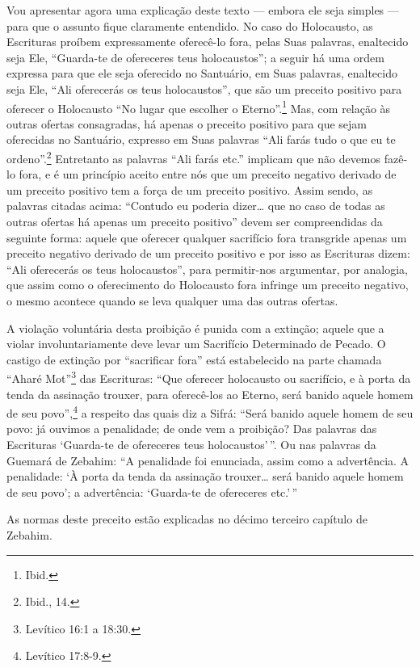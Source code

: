 Vou apresentar agora uma explicação deste texto --- embora ele seja
simples --- para que o assunto fique claramente entendido. No caso do
Holocausto, as Escrituras proíbem expressamente oferecê-lo fora, pelas
Suas palavras, enaltecido seja Ele, ``Guarda-te de ofereceres teus
holocaustos''; a seguir há uma ordem expressa para que ele seja
oferecido no Santuário, em Suas palavras, enaltecido seja Ele, ``Ali
oferecerás os teus holocaustos'', que são um preceito positivo para
oferecer o Holocausto ``No lugar que escolher o Eterno''.\footnote{Ibid.} Mas,
com relação às outras ofertas consagradas, há apenas o preceito
positivo para que sejam oferecidas no Santuário, expresso em Suas
palavras ``Ali farás tudo o que eu te ordeno''.\footnote{Ibid., 14.} Entretanto as
palavras ``Ali farás etc.'' implicam que não devemos fazê-lo fora, e é
um princípio aceito entre nós que um preceito negativo derivado de um
preceito positivo tem a força de um preceito positivo. Assim sendo, as
palavras citadas acima: ``Contudo eu poderia dizer\ldots{} que no caso de
todas as outras ofertas há apenas um preceito positivo'' devem ser
compreendidas da seguinte forma: aquele que oferecer qualquer
sacrifício fora transgride apenas um preceito negativo derivado de um
preceito positivo e por isso as Escrituras dizem: ``Ali oferecerás os
teus holocaustos'', para permitir-nos argumentar, por analogia, que
assim como o oferecimento do Holocausto fora infringe um preceito
negativo, o mesmo acontece quando se leva qualquer uma das outras
ofertas.

A violação voluntária desta proibição é punida com a extinção; aquele
que a violar involuntariamente deve levar um Sacrifício Determinado de
Pecado. O castigo de extinção por ``sacrificar fora'' está estabelecido
na parte chamada ``Aharé Mot''\footnote{Levítico 16:1 a 18:30.} das Escrituras:
``Que oferecer holocausto ou sacrifício, e à porta da tenda da assinação
trouxer, para oferecê-los ao Eterno, será banido aquele homem de seu
povo'',\footnote{Levítico 17:8-9.} a respeito das quais diz a Sifrá: ``Será
banido aquele homem de seu povo: já ouvimos a penalidade; de onde vem a
proibição? Das palavras das Escrituras `Guarda-te de ofereceres teus
holocaustos'\,''. Ou nas palavras da Guemará de Zebahim: ``A penalidade
foi enunciada, assim como a advertência. A penalidade: `À porta da tenda
da assinação trouxer\ldots{} será banido aquele homem de seu povo'; a
advertência: `Guarda-te de ofereceres etc.'\,''

As normas deste preceito estão explicadas no décimo terceiro capítulo
de Zebahim.

